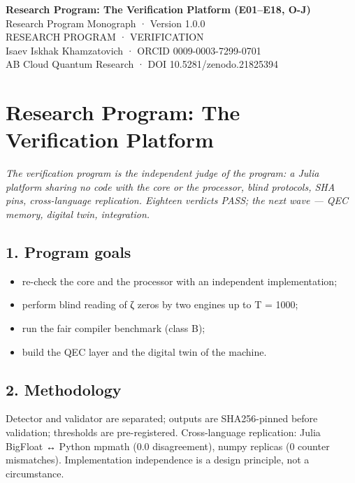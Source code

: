 \documentclass[11pt,a4paper]{article}
\begin{document}
\begin{center}
{\LARGE\bfseries Research Program: The Verification Platform (E01–E18, O-J)}\\[8pt]
{\large Research Program Monograph · Version 1.0.0}\\[6pt]
{\color{copper}\small RESEARCH PROGRAM · VERIFICATION}\\[4pt]
{\small Isaev Iskhak Khamzatovich · ORCID 0009-0003-7299-0701}\\[2pt]
{\small AB Cloud Quantum Research · DOI 10.5281/zenodo.21825394}
\end{center}

\tableofcontents
\newpage

\section{Research Program: The Verification Platform}

\noindent\textit{\color{copper}The verification program is the independent judge of the program: a Julia platform sharing no code with the core or the processor, blind protocols, SHA pins, cross-language replication. Eighteen verdicts PASS; the next wave — QEC memory, digital twin, integration.}

\subsection{1. Program goals}

\begin{itemize}
  \item re-check the core and the processor with an independent implementation;
  \item perform blind reading of ζ zeros by two engines up to T = 1000;
  \item run the fair compiler benchmark (class B);
  \item build the QEC layer and the digital twin of the machine.
\end{itemize}

\subsection{2. Methodology}

Detector and validator are separated; outputs are SHA256-pinned before validation; thresholds are pre-registered. Cross-language replication: Julia BigFloat ↔ Python mpmath (0.0 disagreement), numpy replicas (0 counter mismatches). Implementation independence is a design principle, not a circumstance.
\end{document}
